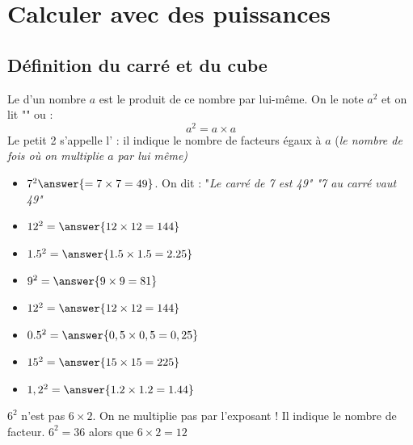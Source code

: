 \section{Calculer avec des puissances}
\subsection{Définition du carré et du cube}
\begin{definitionbox}
    Le  d'un nombre $a$ est le produit de ce nombre par lui-même. 
    On le note $a^2$ et on lit  "" ou  :
    $$a^2=a\times a$$
    Le petit 2 s'appelle l' : il indique le nombre de facteurs égaux à
    $a$ (\it{le nombre de fois où on multiplie $a$ par lui même})
\end{definitionbox}

\begin{exemplebox}
    \begin{itemize}
        \item $7^2\answer{ = 7\times 7 = 49}$. On dit : "\it{Le carré de 7 est 49}"
             "\it{7 au carré vaut 49}"
        \item $12^2=\answer{12 \times 12 = 144}$
        \item $1.5^2=\answer{1.5 \times 1.5 = 2.25}$
    \end{itemize}
\end{exemplebox}

\begin{exercicebox}
    \begin{itemize}
        \item $9^2=\answer{9\times 9=81}$
        \item $12^2 = \answer{12\times 12=144}$
        \item $0.5^2 = \answer{ 0,5\times 0,5=0,25}$  
        \item $15^2 =  \answer{15\times 15=225}$
        \item $1,2^2 = \answer{1.2\times 1.2 = 1.44}$

    \end{itemize}
\end{exercicebox}


\begin{attentionbox}
    $6^2$ n'est pas $6\times 2$. On ne multiplie pas par l'exposant ! Il indique
    le nombre de facteur. $6^2=36$ alors que $6\times2=12$
\end{attentionbox}


